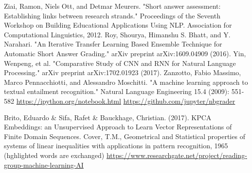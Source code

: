 \documentclass[11pt]{report}
\numberwithin{equation}{section} %
\begin{document}
\begin{thebibliography}{3}
 Ziai, Ramon, Niels Ott, and Detmar Meurers. "Short answer assessment: Establishing links between research strands." Proceedings of the Seventh Workshop on Building Educational Applications Using NLP. Association for Computational Linguistics, 2012.
 Roy, Shourya, Himanshu S. Bhatt, and Y. Narahari. "An Iterative Transfer Learning Based Ensemble Technique for Automatic Short Answer Grading." arXiv preprint arXiv:1609.04909 (2016).
 Yin, Wenpeng, et al. "Comparative Study of CNN and RNN for Natural Language Processing." arXiv preprint arXiv:1702.01923 (2017).
 Zanzotto, Fabio Massimo, Marco Pennacchiotti, and Alessandro Moschitti. "A machine learning approach to textual entailment recognition." Natural Language Engineering 15.4 (2009): 551-582
 \url{https://ipython.org/notebook.html}
 \url{https://github.com/jupyter/nbgrader}


 Brito, Eduardo \& Sifa, Rafet \& Bauckhage, Christian. (2017). KPCA Embeddings: an Unsupervised Approach to Learn Vector Representations of Finite Domain Sequences.
 Cover, T.M., Geometrical and Statistical properties of systems of linear inequalities with applications in pattern recognition, 1965 (hghlighted words are exchanged)
 \url{https://www.researchgate.net/project/reading-group-machine-learning-AI}


\end{thebibliography}
\end{document}

